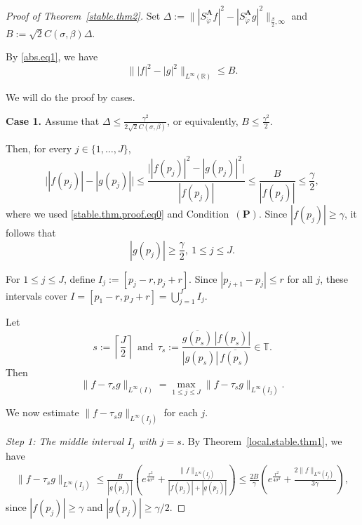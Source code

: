 \documentclass[10pt,a4paper]{amsart}
\newcommand{\R}{\mathbb{R}}
\begin{document}
\begin{proof}[Proof of Theorem~\ref{stable.thm2}]
Set
$\Delta := \bigl\| |S_{\check{\varphi}}^{\mathbf A}f|^2 - |S_{\check{\varphi}}^{\mathbf A}g|^2\bigr\|_{\frac{\beta}{2},\infty} $ 
and
 $B:=\sqrt{2}C(\sigma,\beta)\Delta.$ 

By \eqref{abs.eq1}, we have
\begin{equation}\label{stable.thm.proof.eq0}
\bigl\||f|^2-|g|^2\bigr\|_{L^\infty(\R)} \le B.
\end{equation}

We will do the proof by cases.
 
\smallskip
\noindent
\textbf{Case 1.} Assume that $\Delta\le \frac{\gamma^2}{2\sqrt{2}C(\sigma,\beta)}$, or equivalently,
$ B\le \frac{\gamma^2}{2}$. 

Then, for every $j\in\{1,\dots,J\}$,
$$\bigl||f(p_j)|-|g(p_j)|\bigr| \le \frac{\bigl||f(p_j)|^2-|g(p_j)|^2\bigr|}{|f(p_j)|} \le
\frac{B}{|f(p_j)|} \le \frac{\gamma}{2},$$
where we used \eqref{stable.thm.proof.eq0} and Condition~$(\mathbf P)$. Since
$|f(p_j)|\ge \gamma$, it follows that
$$ |g(p_j)|\ge \frac{\gamma}{2}, \ 1\le j\le J. $$

For $1\le j\le J$, define $ I_j:=[p_j-r,p_j+r].$ Since $|p_{j+1}-p_j|\le r$ for all $j$, these intervals cover $ I=[p_1-r,p_J+r]=\bigcup_{j=1}^J I_j.$

Let
$$ s:=\left\lceil \frac{J}{2}\right\rceil
 \ \ \text{and} \ \
\tau_s:=\frac{\overline{g(p_s)}\,|f(p_s)|}{|g(p_s)|\,\overline{f(p_s)}}\in\mathbb T. $$
Then
$$ \|f-\tau_s g\|_{L^\infty(I)} = \max_{1\le j\le J}\|f-\tau_s g\|_{L^\infty(I_j)}.$$

We now estimate $\|f-\tau_s g\|_{L^\infty(I_j)}$ for each $j$.

\medskip
\noindent
\emph{Step 1: The middle interval \(I_j\) with $j=s$.} 
By Theorem~\ref{local.stable.thm1}, we have 
 \begin{align}\label{stable.thm.eq.middle}
        \| f - \tau_s g \|_{L^{\infty} (I_j)} \le \frac{B}{|g(p_j)|} \left( e^{\frac{r^2}{4\sigma^2}} + \frac{\|f\|_{L^\infty(I_j)}}{|f(p_j)| + |g(p_j)|} \right)  \le \frac{2B}{\gamma} \left( e^{\frac{r^2}{4\sigma^2}} + \frac{2 \|f\|_{L^\infty(I_j)}}{3\gamma} \right), 
    \end{align}
since $|f(p_j)|\ge \gamma$ and $|g(p_j)|\ge \gamma/2$.


\end{proof}
\end{document}
